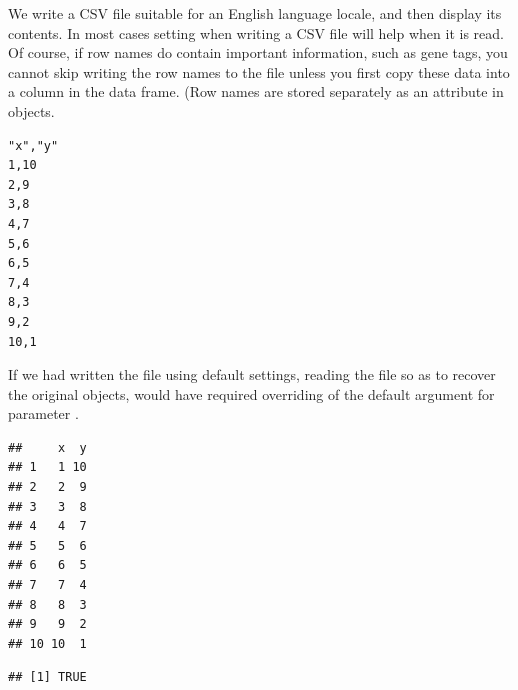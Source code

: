\documentclass[krantz2]{krantz}\usepackage{knitr}%
\begin{document}
We write a CSV file suitable for an English language locale, and then display its contents. In most cases setting  when writing a CSV file will help when it is read. Of course, if row names do contain important information, such as gene tags, you cannot skip writing the row names to the file unless you first copy these data into a column in the data frame. (Row names are stored separately as an attribute in  objects.
\begin{knitrout}\footnotesize
{}\color{fgcolor}\begin{kframe}
\begin{alltt}
  \hlstd{=} \hlstd{,}  \hlstd{=} \hlstd{)}
\hlstd{(}\hlstd{,}  \hlstd{=} \hlstd{)}
\end{alltt}
\end{kframe}
\end{knitrout}

\begin{knitrout}\footnotesize
{}\color{fgcolor}\begin{kframe}
\begin{verbatim}
"x","y"
1,10
2,9
3,8
4,7
5,6
6,5
7,4
8,3
9,2
10,1
\end{verbatim}
\end{kframe}
\end{knitrout}

If we had written the file using default settings, reading the file so as to recover the original objects, would have required overriding of the default argument for parameter .
\begin{knitrout}\footnotesize
{}\color{fgcolor}\begin{kframe}
\begin{alltt}
 \hlkwb{<-} \hlstd{(} \hlstd{=} \hlstd{)}
\end{alltt}
\begin{verbatim}
##     x  y
## 1   1 10
## 2   2  9
## 3   3  8
## 4   4  7
## 5   5  6
## 6   6  5
## 7   7  4
## 8   8  3
## 9   9  2
## 10 10  1
\end{verbatim}
\begin{alltt}
  \hlstd{=} \hlstd{)}
\end{alltt}
\begin{verbatim}
## [1] TRUE
\end{verbatim}
\end{kframe}
\end{knitrout}
\end{document}
